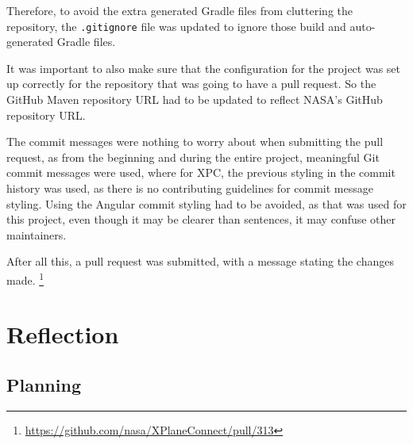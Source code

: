 \documentclass[../dissertation.tex]{subfiles}
\begin{document}
Therefore, to avoid the extra generated Gradle files from cluttering the repository,
the \lstinline|.gitignore| file was updated to ignore those build and auto-generated
Gradle files.

It was important to also make sure that the configuration for the project was set up correctly
for the repository that was going to have a pull request. So the GitHub Maven repository
URL had to be updated to reflect NASA's GitHub repository URL.

The commit messages were nothing to worry about when submitting the pull request, as from
the beginning and during the entire project, meaningful Git commit messages were used,
where for XPC, the previous styling in the commit history was used, as there is no contributing
guidelines for commit message styling. Using the Angular commit styling had to be avoided, as
that was used for this project, even though it may be clearer than sentences, it may confuse
other maintainers.

After all this, a pull request was submitted, with a message stating the changes made.%
\footnote{\url{https://github.com/nasa/XPlaneConnect/pull/313}}


\section{Reflection}
\subsection{Planning}


\end{document}
